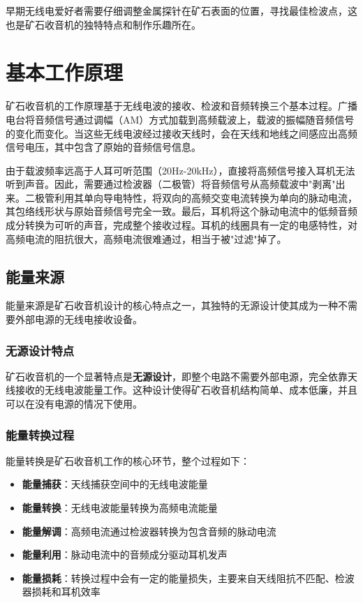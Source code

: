 \documentclass[12pt,UTF8]{ctexbook}
\begin{document}
早期无线电爱好者需要仔细调整金属探针在矿石表面的位置，寻找最佳检波点，这也是矿石收音机的独特特点和制作乐趣所在。

\section{基本工作原理}

矿石收音机的工作原理基于无线电波的接收、检波和音频转换三个基本过程。广播电台将音频信号通过调幅（AM）方式加载到高频载波上，载波的振幅随音频信号的变化而变化。当这些无线电波经过接收天线时，会在天线和地线之间感应出高频信号电压，其中包含了原始的音频信号信息。

由于载波频率远高于人耳可听范围（20Hz-20kHz），直接将高频信号接入耳机无法听到声音。因此，需要通过检波器（二极管）将音频信号从高频载波中"剥离"出来。二极管利用其单向导电特性，将双向的高频交变电流转换为单向的脉动电流，其包络线形状与原始音频信号完全一致。最后，耳机将这个脉动电流中的低频音频成分转换为可听的声音，完成整个接收过程。耳机的线圈具有一定的电感特性，对高频电流的阻抗很大，高频电流很难通过，相当于被"过滤"掉了。

\subsection{能量来源}

能量来源是矿石收音机设计的核心特点之一，其独特的无源设计使其成为一种不需要外部电源的无线电接收设备。

\subsubsection{无源设计特点}
矿石收音机的一个显著特点是\textbf{无源设计}，即整个电路不需要外部电源，完全依靠天线接收的无线电波能量工作。这种设计使得矿石收音机结构简单、成本低廉，并且可以在没有电源的情况下使用。

\subsubsection{能量转换过程}
能量转换是矿石收音机工作的核心环节，整个过程如下：
\begin{itemize}[leftmargin=3.5em]
  \item \textbf{能量捕获}：天线捕获空间中的无线电波能量
  \item \textbf{能量转换}：无线电波能量转换为高频电流能量
  \item \textbf{能量解调}：高频电流通过检波器转换为包含音频的脉动电流
  \item \textbf{能量利用}：脉动电流中的音频成分驱动耳机发声
  \item \textbf{能量损耗}：转换过程中会有一定的能量损失，主要来自天线阻抗不匹配、检波器损耗和耳机效率
\end{itemize}
\end{document}
